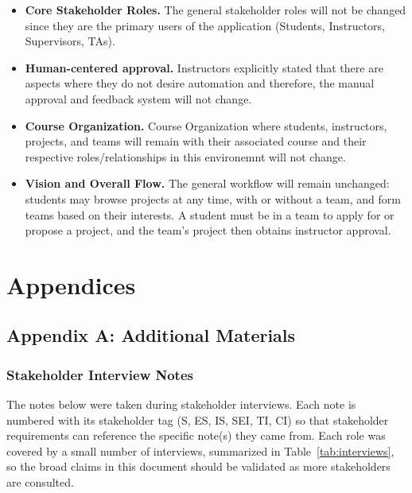 \documentclass[12pt]{article}
\begin{document}
  \noindent \begin{itemize}
    \item
    \textbf{Core Stakeholder Roles.} The general stakeholder roles will not be changed since they are the primary users
    of the application (Students, Instructors, Supervisors, TAs).
    \item
    \textbf{Human-centered approval.} Instructors explicitly stated that there are aspects where they do not desire
    automation and therefore, the manual approval and feedback system will not change.
    \item
    \textbf{Course Organization.} Course Organization where students, instructors, projects, and teams will remain with their 
    associated course and their respective roles/relationships in this environemnt will not change.
    \item
    \textbf{Vision and Overall Flow.} The general workflow will remain unchanged: students may
    browse projects at any time, with or without a team, and form teams based on their interests. A student must be in
    a team to apply for or propose a project, and the team's project then obtains instructor approval.
  \end{itemize}

  \newpage{}

  \section{Appendices}

  \subsection{Appendix A: Additional Materials}
  \label{app:additional}

  \subsubsection{Stakeholder Interview Notes}
  \label{app:interviews}

  The notes below were taken during stakeholder interviews. Each note is numbered
  with its stakeholder tag (S, ES, IS, SEI, TI, CI) so that stakeholder requirements can
  reference the specific note(s) they came from. Each role was covered by a small number of interviews, summarized
  in Table~\ref{tab:interviews}, so the broad claims in this document should be validated as more stakeholders are
  consulted.
\end{document}
